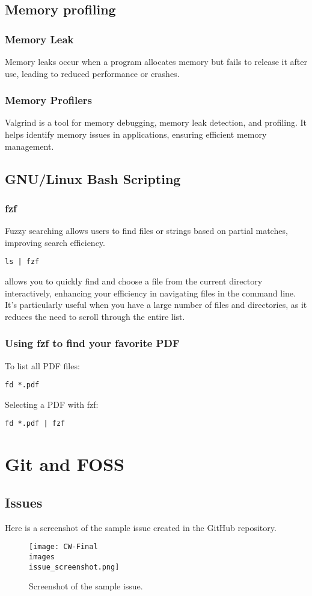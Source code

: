 \documentclass{article}
\begin{document}
\subsection{Memory profiling}  
\subsubsection{Memory Leak}
Memory leaks occur when a program allocates memory but fails to release it after use, leading to reduced performance or crashes.
\subsubsection{Memory Profilers}  
Valgrind is a tool for memory debugging, memory leak detection, and profiling. It helps identify memory issues in applications, ensuring efficient memory management.
\subsection{GNU/Linux Bash Scripting}
\subsubsection{fzf}  
Fuzzy searching allows users to find files or strings based on partial matches, improving search efficiency.
\begin{verbatim}  
ls | fzf 
\end{verbatim}  
allows you to quickly find and choose a file from the current directory interactively, enhancing your efficiency in navigating files in the command line. It's particularly useful when you have a large number of files and directories, as it reduces the need to scroll through the entire list.
\subsubsection{Using fzf to find your favorite PDF}
To list all PDF files:  
\begin{verbatim}  
fd *.pdf  
\end{verbatim}  
Selecting a PDF with fzf:  
\begin{verbatim}  
fd *.pdf | fzf  
\end{verbatim}
\section{Git and FOSS}
\subsection{Issues}
Here is a screenshot of the sample issue created in the GitHub repository.  

\begin{figure}[h]  
  \centering  
  \texttt{[image: CW-Final\\images\\issue\_screenshot.png]}  
  \caption{Screenshot of the sample issue.}  
  \label{fig:issue_screenshot}  
\end{figure}  
\end{document}
